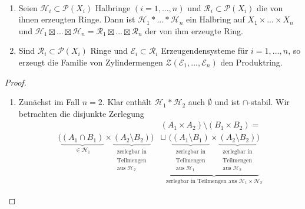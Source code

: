 \begin{proposition} \
\begin{mdframed}
\begin{enumerate}[(\roman*),topsep=5pt]
	\item Seien $\mathcal{H}_i \subset \mathcal{P}(X_i)$ Halbringe $(i=1,...,n)$ und $\mathcal{R}_i \subset \mathcal{P}(X_i)$ die von ihnen erzeugten Ringe. Dann ist $\mathcal{H}_1 \ast ... \ast \mathcal{H}_n$ ein Halbring auf $X_1 \times ... \times X_n$ und $\mathcal{H}_1 \boxtimes ... \boxtimes \mathcal{H}_n =\mathcal{R}_1 \boxtimes ... \boxtimes \mathcal{R}_n$ der von ihm erzeugte Ring.
	\item Sind $\mathcal{R}_i \subset \mathcal{P}(X_i)$ Ringe und $\mathcal{E}_i \subset \mathcal{R}_i$ Erzeugendensysteme für $i=1,...,n$, so erzeugt die Familie von Zylindermengen $\mathcal{Z}(\mathcal{E}_1,...,\mathcal{E}_n)$ den Produktring.
\end{enumerate}
\end{mdframed}
\label{propC}
\begin{proof} \
\begin{enumerate}[(\roman*),topsep=5pt]
	\item Zunächst im Fall $n=2$. Klar enthält $\mathcal{H}_1 \ast \mathcal{H}_2$ auch $\emptyset$ und ist $\cap$-stabil. Wir betrachten die disjunkte Zerlegung
	\begin{equation*}
	\begin{split}
		&(A_1 \times A_2) \setminus (B_1 \times B_2) =\\
	 \big( \underbrace{(A_1 \cap B_1)}_{\in \mathcal{H}_1} \times \underbrace{(A_2 \setminus B_2)}_{\substack{\text{zerlegbar in} \\ \text{Teilmengen}\\ \text{aus }\mathcal{H}_2}} \big) & \sqcup \underbrace{\big( \underbrace{(A_1 \setminus B_1)}_{\substack{\text{zerlegbar in} \\ \text{Teilmengen}\\ \text{aus }\mathcal{H}_1}} \times \underbrace{(A_2 \setminus B_2)}_{\substack{\text{zerlegbar in} \\ \text{Teilmengen}\\ \text{aus }\mathcal{H}_2}} \big)}_{\text{zerlegbar in Teilmengen aus } \mathcal{H}_1 \times \mathcal{H}_2}

\end{split}
\end{equation*}
\end{enumerate}
\end{proof}
\end{proposition}
